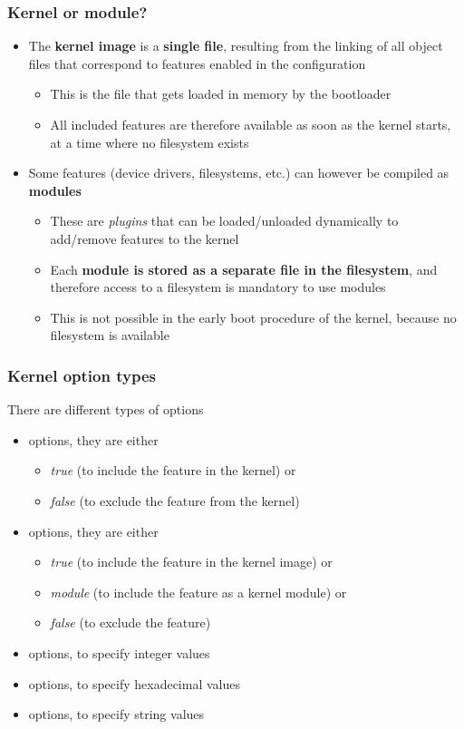 \begin{frame}
  \frametitle{Kernel or module?}
  \begin{itemize}
  \item The {\bf kernel image} is a {\bf single file}, resulting from
    the linking of all object files that correspond to features
    enabled in the configuration
    \begin{itemize}
    \item This is the file that gets loaded in memory by the
      bootloader
    \item All included features are therefore available as soon as the
      kernel starts, at a time where no filesystem exists
    \end{itemize}
  \item Some features (device drivers, filesystems, etc.) can however
    be compiled as {\bf modules}
    \begin{itemize}
    \item These are {\em plugins} that can be loaded/unloaded dynamically to
      add/remove features to the kernel
    \item Each {\bf module is stored as a separate file in the
        filesystem}, and therefore access to a filesystem is mandatory
      to use modules
    \item This is not possible in the early boot procedure of the
      kernel, because no filesystem is available
    \end{itemize}
  \end{itemize}
\end{frame}

\begin{frame}
  \frametitle{Kernel option types}
  There are different types of options
  \begin{itemize}
  \item {} options, they are either
    \begin{itemize}
    \item {\em true} (to include the feature in the kernel) or
    \item {\em false} (to exclude the feature from the kernel)
    \end{itemize}
  \item {} options, they are either
    \begin{itemize}
    \item {\em true} (to include the feature in the kernel image) or
    \item {\em module} (to include the feature as a kernel module) or
    \item {\em false} (to exclude the feature)
    \end{itemize}
  \item {} options, to specify integer values
  \item {} options, to specify hexadecimal values
  \item {} options, to specify string values
  \end{itemize}
\end{frame}

